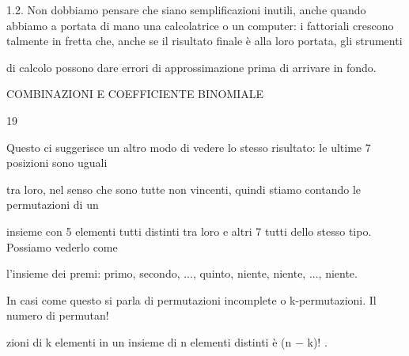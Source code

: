 \documentclass[a4paper,portrait,12pt]{article}
\begin{document}
\begin{flushleft}
1.2. Non dobbiamo pensare che siano semplificazioni inutili, anche quando abbiamo a portata di mano una calcolatrice o un computer: i fattoriali crescono talmente in fretta che, anche se il risultato finale \`{e} alla loro portata, gli strumenti
\end{flushleft}


\begin{flushleft}
di calcolo possono dare errori di approssimazione prima di arrivare in fondo.
\end{flushleft}





\begin{flushleft}
 COMBINAZIONI E COEFFICIENTE BINOMIALE
\end{flushleft}





19





\begin{flushleft}
Questo ci suggerisce un altro modo di vedere lo stesso risultato: le ultime 7 posizioni sono uguali
\end{flushleft}


\begin{flushleft}
tra loro, nel senso che sono tutte non vincenti, quindi stiamo contando le permutazioni di un
\end{flushleft}


\begin{flushleft}
insieme con 5 elementi tutti distinti tra loro e altri 7 tutti dello stesso tipo. Possiamo vederlo come
\end{flushleft}


\begin{flushleft}
l'insieme dei premi: primo, secondo, ..., quinto, niente, niente, ..., niente.
\end{flushleft}


\begin{flushleft}
In casi come questo si parla di permutazioni incomplete o k-permutazioni. Il numero di permutan!
\end{flushleft}


\begin{flushleft}
zioni di k elementi in un insieme di n elementi distinti \`{e} (n $-$ k)! .
\end{flushleft}
\end{document}

